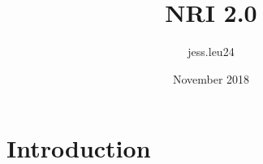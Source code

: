 \documentclass{article}
\title{NRI 2.0}
\author{jess.leu24 }
\date{November 2018}
\begin{document}
\maketitle

\section{Introduction}
\end{document}
